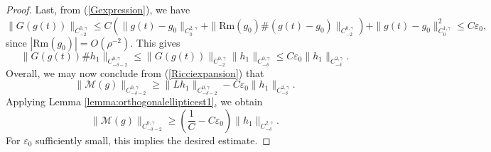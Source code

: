 \documentclass[12pt]{amsart}
\newcommand{\calM}{\mathcal{M}}
\renewcommand{\1}{{\mathbf 1}}
\newcommand{\Rm}{\mathrm{Rm}}
\newcommand{\eps}{{\varepsilon}}
\theoremstyle{others}
\numberwithin{equation}{section}
\begin{document}
\begin{proof}
    Last, from (\ref{Gexpression}), we have
    $$\|G(g(t)) \|_{C^{0,\gamma}_{-2}} \leq C \left( \|g(t) - g_0 \|_{C^{2, \gamma}_0} + \|\Rm(g_0) \# (g(t) - g_0) \|_{C^{0,\gamma}_{-2}} \right) + \|g(t) - g_0 \|^2_{C^{1, \gamma}_0} \leq C \eps_0,$$
    since $| \Rm(g_0) | = O(\rho^{-2}).$
    This gives
    $$\| G(g(t)) \# h_1 \|_{C^{0, \gamma}_{- \delta - 2}} \leq \|G(g(t)) \|_{C^{0, \gamma}_{-2}} \| h_1 \|_{C^{0, \gamma}_{-\delta}} \leq C \eps_0 \| h_1 \|_{C^{2, \gamma}_{-\delta}}.
    $$
    Overall, we may now conclude from (\ref{Ricciexpansion}) that
    $$\| \calM(g) \|_{C^{0, \gamma}_{-\delta - 2}} \geq \|L h_1 \|_{C^{0, \gamma}_{-\delta - 2}} - C \eps_0 \| h_1 \|_{C^{2, \gamma}_{-\delta}}.$$
    Applying Lemma \ref{lemma:orthogonalellipticest1}, we obtain
        $$\| \calM(g) \|_{C^{0, \gamma}_{-\delta - 2}} \geq \left( \frac{1}{C} - C \eps_0 \right) \| h_1 \|_{C^{2, \gamma}_{-\delta}}.$$
        For $\eps_0$ sufficiently small, this implies the desired estimate.
\end{proof}
\end{document}
